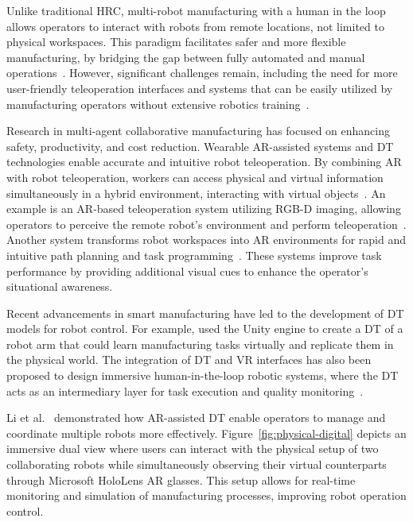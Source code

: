 Unlike traditional \ac{HRC}, multi-robot manufacturing with a human in the loop allows operators to interact with robots from remote locations, not limited to physical workspaces. This paradigm facilitates safer and more flexible manufacturing, by bridging the gap between fully automated and manual operations~\cite{7-ar-dt}. However, significant challenges remain, including the need for more user-friendly teleoperation interfaces and systems that can be easily utilized by manufacturing operators without extensive robotics training~\cite{9-ar-dt}.

Research in multi-agent collaborative manufacturing has focused on enhancing safety, productivity, and cost reduction. Wearable \ac{AR}-assisted systems and \ac{DT} technologies enable accurate and intuitive robot teleoperation. By combining \ac{AR} with robot teleoperation, workers can access physical and virtual information simultaneously in a hybrid environment, interacting with virtual objects~\cite{26-ar-dt,27-ar-dt}. An example is an \ac{AR}-based teleoperation system utilizing RGB-D imaging, allowing operators to perceive the remote robot's environment and perform teleoperation~\cite{10-ar-dt}. Another system transforms robot workspaces into \ac{AR} environments for rapid and intuitive path planning and task programming~\cite{30-ar-dt}. These systems improve task performance by providing additional visual cues to enhance the operator's situational awareness.

Recent advancements in smart manufacturing have led to the development of \ac{DT} models for robot control. For example, \cite{37-ar-dt} used the Unity engine to create a \ac{DT} of a robot arm that could learn manufacturing tasks virtually and replicate them in the physical world. The integration of \ac{DT} and \ac{VR} interfaces has also been proposed to design immersive human-in-the-loop robotic systems, where the \ac{DT} acts as an intermediary layer for task execution and quality monitoring~\cite{41-ar-dt,42-ar-dt}.

Li et al.~\cite{LI2022102321} demonstrated how \ac{AR}-assisted \ac{DT} enable operators to manage and coordinate multiple robots more effectively.
Figure~\ref{fig:physical-digital} depicts an immersive dual view where users can interact with the physical setup of two collaborating robots while simultaneously observing their virtual counterparts through Microsoft HoloLens \ac{AR} glasses. This setup allows for real-time monitoring and simulation of manufacturing processes, improving robot operation control.

